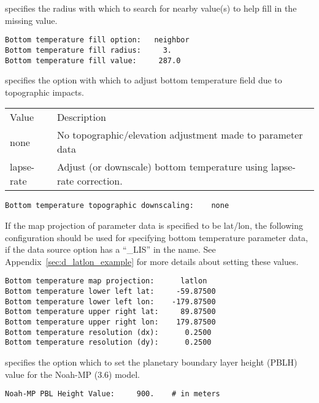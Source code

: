   specifies the radius with which
 to search for nearby value(s) to help fill in the missing value.
 

 \begin{Verbatim}[frame=single]
Bottom temperature fill option:   neighbor    
Bottom temperature fill radius:     3.      
Bottom temperature fill value:     287.0      
 \end{Verbatim}

 
  specifies the
 option with which to adjust bottom temperature field due to
 topographic impacts.

 \begin{tabular}{ll}
 Value       & Description                  \\
 none        & No topographic/elevation adjustment made to 
               parameter data \\
 lapse-rate  & Adjust (or downscale) bottom temperature using
               lapse-rate correction. \\
 \end{tabular}
 

 \begin{Verbatim}[frame=single]
Bottom temperature topographic downscaling:    none
 \end{Verbatim}

 
 If the map projection of parameter data is specified to be lat/lon, 
 the following configuration should be used for specifying bottom
 temperature parameter data, if the data source option has a 
 ``\_LIS'' in the name.
 See Appendix~\ref{sec:d_latlon_example} for more details about
 setting these values.
 

 \begin{Verbatim}[frame=single]
Bottom temperature map projection:      latlon 
Bottom temperature lower left lat:     -59.87500
Bottom temperature lower left lon:    -179.87500
Bottom temperature upper right lat:     89.87500
Bottom temperature upper right lon:    179.87500
Bottom temperature resolution (dx):      0.2500
Bottom temperature resolution (dy):      0.2500
 \end{Verbatim}

 
  specifies the
 option which to set the planetary boundary layer
 height (PBLH) value for the Noah-MP (3.6) model.

 

 \begin{Verbatim}[frame=single]
Noah-MP PBL Height Value:     900.    # in meters
 \end{Verbatim}


